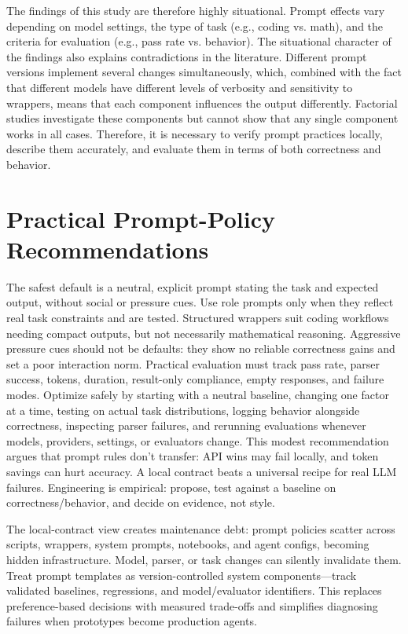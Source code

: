 The findings of this study are therefore highly situational. Prompt effects vary depending on model settings, the type of task (e.g., coding vs. math), and the criteria for evaluation (e.g., pass rate vs. behavior). The situational character of the findings also explains contradictions in the literature. Different prompt versions implement several changes simultaneously, which, combined with the fact that different models have different levels of verbosity and sensitivity to wrappers, means that each component influences the output differently. Factorial studies investigate these components but cannot show that any single component works in all cases. Therefore, it is necessary to verify prompt practices locally, describe them accurately, and evaluate them in terms of both correctness and behavior.

\section{Practical Prompt-Policy Recommendations}

The safest default is a neutral, explicit prompt stating the task and expected output, without social or pressure cues. Use role prompts only when they reflect real task constraints and are tested. Structured wrappers suit coding workflows needing compact outputs, but not necessarily mathematical reasoning. Aggressive pressure cues should not be defaults: they show no reliable correctness gains and set a poor interaction norm. Practical evaluation must track pass rate, parser success, tokens, duration, result-only compliance, empty responses, and failure modes. Optimize safely by starting with a neutral baseline, changing one factor at a time, testing on actual task distributions, logging behavior alongside correctness, inspecting parser failures, and rerunning evaluations whenever models, providers, settings, or evaluators change. This modest recommendation argues that prompt rules don't transfer: API wins may fail locally, and token savings can hurt accuracy. A local contract beats a universal recipe for real LLM failures. Engineering is empirical: propose, test against a baseline on correctness/behavior, and decide on evidence, not style.

The local-contract view creates maintenance debt: prompt policies scatter across scripts, wrappers, system prompts, notebooks, and agent configs, becoming hidden infrastructure. Model, parser, or task changes can silently invalidate them. Treat prompt templates as version-controlled system components—track validated baselines, regressions, and model/evaluator identifiers. This replaces preference-based decisions with measured trade-offs and simplifies diagnosing failures when prototypes become production agents.

